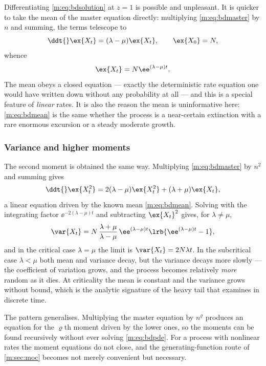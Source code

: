 Differentiating \cref{m:eq:bdsolution} at $z=1$ is possible and unpleasant. It is
quicker to take the mean of the master equation directly: multiplying
\cref{m:eq:bdmaster} by $n$ and summing, the terms telescope to
\begin{equation}
\label{m:eq:meanode}
\ddt{}\ex{X_t} = (\lambda-\mu)\ex{X_t},
\qquad
\ex{X_0}=N,
\end{equation}
whence
\begin{equation}
\label{m:eq:bdmean}
\ex{X_t} = N\ee^{(\lambda-\mu)t} .
\end{equation}
The mean obeys a closed equation --- exactly the deterministic rate equation one
would have written down without any probability at all --- and this is a special
feature of \emph{linear} rates. It is also the reason the mean is uninformative
here: \cref{m:eq:bdmean} is the same whether the process is a near-certain
extinction with a rare enormous excursion or a steady moderate growth.

\subsubsection{Variance and higher moments}
\label{m:sec:variance}

The second moment is obtained the same way. Multiplying \cref{m:eq:bdmaster} by
$n^2$ and summing gives
\begin{equation}
\label{m:eq:secondmomentode}
\ddt{}\ex{X_t^2} = 2(\lambda-\mu)\ex{X_t^2} + (\lambda+\mu)\ex{X_t},
\end{equation}
a linear equation driven by the known mean \cref{m:eq:bdmean}. Solving with the
integrating factor $\ee^{-2(\lambda-\mu)t}$ and subtracting $\ex{X_t}^2$ gives, for
$\lambda\neq\mu$,
\begin{equation}
\label{m:eq:bdvariance}
\var{X_t} = N\,\frac{\lambda+\mu}{\lambda-\mu}\,
\ee^{(\lambda-\mu)t}\lrb{\ee^{(\lambda-\mu)t}-1},
\end{equation}
and in the critical case $\lambda=\mu$ the limit is $\var{X_t}=2N\lambda t$. In the
subcritical case $\lambda<\mu$ both mean and
variance decay, but the variance decays more slowly --- the coefficient of
variation grows, and the process becomes relatively \emph{more} random as it dies.
At criticality the mean is constant and the variance grows without bound, which is
the analytic signature of the heavy tail that \ChA{} examines in discrete time.

The pattern generalises. Multiplying the master equation by $n^{\varrho}$ produces
an equation for the $\varrho$th moment driven by the lower ones, so the moments can
be found recursively without ever solving \cref{m:eq:bdpde}. For a process with
nonlinear rates the moment equations do not close, and the generating-function
route of \cref{m:sec:moc} becomes not merely convenient but necessary.

